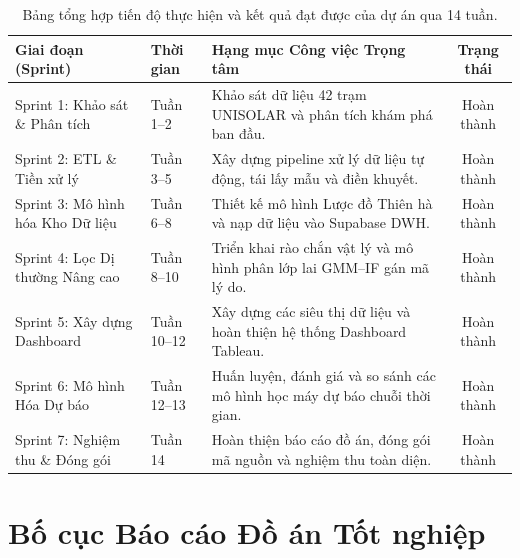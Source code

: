 \documentclass[12pt, a4paper]{report}
\begin{document}
\begin{table}[H]
\centering
\small
\renewcommand{\arraystretch}{1.25}
\begin{tabularx}{\textwidth}{@{} l l X c @{}}
\toprule
\textbf{Giai đoạn (Sprint)} & \textbf{Thời gian} & \textbf{Hạng mục Công việc Trọng tâm} & \textbf{Trạng thái} \\
\midrule
Sprint 1: Khảo sát \& Phân tích & Tuần 1--2 & Khảo sát dữ liệu 42 trạm UNISOLAR và phân tích khám phá ban đầu. & Hoàn thành \\
Sprint 2: ETL \& Tiền xử lý & Tuần 3--5 & Xây dựng pipeline xử lý dữ liệu tự động, tái lấy mẫu và điền khuyết. & Hoàn thành \\
Sprint 3: Mô hình hóa Kho Dữ liệu & Tuần 6--8 & Thiết kế mô hình Lược đồ Thiên hà và nạp dữ liệu vào Supabase DWH. & Hoàn thành \\
Sprint 4: Lọc Dị thường Nâng cao & Tuần 8--10 & Triển khai rào chắn vật lý và mô hình phân lớp lai GMM--IF gán mã lý do. & Hoàn thành \\
Sprint 5: Xây dựng Dashboard & Tuần 10--12 & Xây dựng các siêu thị dữ liệu và hoàn thiện hệ thống Dashboard Tableau. & Hoàn thành \\
Sprint 6: Mô hình Hóa Dự báo & Tuần 12--13 & Huấn luyện, đánh giá và so sánh các mô hình học máy dự báo chuỗi thời gian. & Hoàn thành \\
Sprint 7: Nghiệm thu \& Đóng gói & Tuần 14 & Hoàn thiện báo cáo đồ án, đóng gói mã nguồn và nghiệm thu toàn diện. & Hoàn thành \\
\bottomrule
\end{tabularx}
\caption{Bảng tổng hợp tiến độ thực hiện và kết quả đạt được của dự án qua 14 tuần.}
\label{tab:project_timeline}
\end{table}

\section{Bố cục Báo cáo Đồ án Tốt nghiệp}
\label{sec:bocuc}
\end{document}
